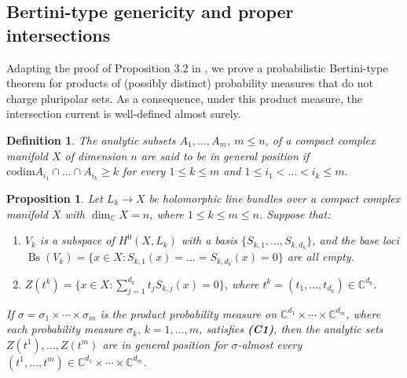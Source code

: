 \documentclass[11pt,leqno,oneside]{amsart}
\newtheorem{prop}[thm]{Proposition}
\newtheorem{defn}[thm]{Definition}
\numberwithin{equation}{section}
\begin{document}
\subsection{Bertini-type genericity and proper intersections}\label{app-bertini}
Adapting the proof of Proposition 3.2 in \cite{CMN}, we prove a probabilistic Bertini-type theorem for products of (possibly distinct) probability measures that do not charge pluripolar sets. As a consequence, under this product measure, the intersection current is well-defined almost surely.
\begin{defn}\label{gpdef}
	The analytic subsets $A_{1},\ldots, A_{m}, \ m\leq n$, of a compact complex manifold $X$ of dimension $n$ are said to be in general position if $\mathrm{codim}A_{i_{1}}\cap \ldots \cap A_{i_{k}}\geq k $ for every $1\leq k\leq m$ and $1\leq i_{1}<\ldots<i_{k}\leq m.$
\end{defn}


\begin{prop} \label{bertiniseveral}
	Let $L_{k} \to X $ be holomorphic line bundles over a compact complex manifold $X$ with $\dim_{\mathbb{C}}{X}=n$, where $1 \leq k \leq m \leq n$. Suppose that:
	
	\begin{enumerate}
		\item[(i)] $V_k$ is a subspace of $H^0(X, L_{k})$ with a basis $\{S_{k, 1}, \ldots, S_{k, d_{k}}\}$, and the base loci $ \operatorname{Bs}(V_{k}) = \{x\in X: S_{k, 1}(x) = \ldots = S_{k, d_{k}}(x) = 0\}$ are all empty.
		\item[(ii)] $Z(t^{k}) = \{ x \in X : \sum_{j=1}^{d_{k}} {t_j S_{k, j}(x) = 0} \} $, where $t^{k} = (t_1, \ldots, t_{d_{k}}) \in \mathbb{C}^{d_{k}}$.
	\end{enumerate}
	
	If $\sigma=\sigma_{1} \times \cdots \times \sigma_{m}$ is the product probability measure on $\mathbb{C}^{d_{1}} \times \cdots \times \mathbb{C}^{d_{m}}$, where each probability measure $\sigma_k,\,k=1,\ldots, m$, satisfies \textbf{(C1)}, then the analytic sets $Z(t^{1}),  \ldots , Z(t^{m})$ are in general position for $\sigma$-almost every $(t^{1}, \ldots, t^{m}) \in \mathbb{C}^{d_{1}} \times \cdots \times \mathbb{C}^{d_{m}}$.
\end{prop}
\end{document}
